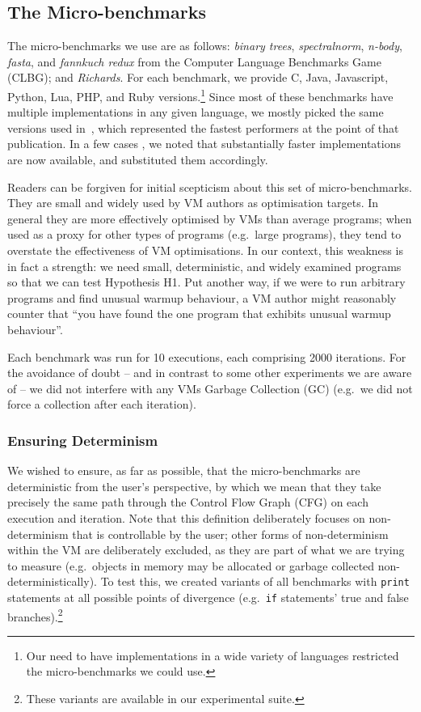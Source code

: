\documentclass[10pt,preprint]{sigplanconf}
\newcommand{\hypone}{H1\xspace}
\newcommand{\binarytrees}{\emph{binary trees}\xspace}
\newcommand{\richards}{\emph{Richards}\xspace}
\newcommand{\spectralnorm}{\emph{spectralnorm}\xspace}
\newcommand{\nbody}{\emph{n-body}\xspace}
\newcommand{\fasta}{\emph{fasta}\xspace}
\newcommand{\fannkuch}{\emph{fannkuch redux}\xspace}
\begin{document}
\subsection{The Micro-benchmarks}

The micro-benchmarks we use are as follows: \binarytrees, \spectralnorm, \nbody,
\fasta, and \fannkuch from the Computer Language Benchmarks Game (CLBG); and
\richards. For each benchmark, we provide C, Java, Javascript, Python, Lua, PHP,
and Ruby versions.\footnote{Our need to have implementations in a wide variety
of languages restricted the micro-benchmarks we could use.} Since most of these
benchmarks have multiple implementations in any given language, we mostly picked
the same versions used in~\cite{bolz14impact}, which represented the fastest
performers at the point of that publication. In a few cases , we noted that
substantially faster implementations are now available, and substituted them
accordingly.

Readers can be forgiven for initial scepticism about this set of micro-benchmarks.
They are small and widely
used by VM authors as optimisation targets. In general they are more effectively
optimised by VMs than average programs; when used as a proxy for other types
of programs (e.g.~large programs), they tend to overstate the effectiveness of
VM optimisations. In our context, this weakness is in fact a strength: we need
small, deterministic, and widely examined programs so that we can test
Hypothesis \hypone. Put another way, if we were to run arbitrary programs
and find unusual warmup behaviour, a VM author might reasonably counter that
``you have found the one program that exhibits unusual warmup behaviour''.

Each benchmark was run for 10 executions, each comprising 2000
iterations. For the avoidance of doubt -- and in
contrast to some other experiments we are aware of  -- we
did not interfere with any VMs Garbage Collection (GC) (e.g.~we did not
force a collection after each iteration).


\subsubsection{Ensuring Determinism}

We wished to ensure, as far as possible, that the micro-benchmarks are
deterministic from the user's perspective, by which we mean that they
take precisely the same path through the Control Flow Graph (CFG) on each
execution and iteration. Note that this definition deliberately focuses
on non-determinism that is controllable by the user; other forms of
non-determinism within the VM are deliberately excluded, as they are
part of what we are trying to measure (e.g.~objects in memory may be allocated
or garbage collected non-deterministically). To test this, we created variants
of all benchmarks with \texttt{print} statements at all possible points of
divergence (e.g.~\texttt{if} statements' true and false branches).\footnote{These
variants are available in our experimental suite.}
\end{document}
